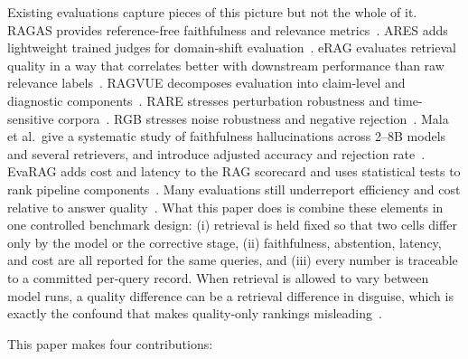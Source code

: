 Existing evaluations capture pieces of this picture but not the whole of
it. RAGAS provides reference-free faithfulness and relevance metrics~\cite{es2023ragas}.
ARES adds lightweight trained judges for domain-shift evaluation~\cite{saadfalcon2023ares}.
eRAG evaluates retrieval quality in a way that correlates better with
downstream performance than raw relevance labels~\cite{salemi2024erag}.
RAGVUE decomposes evaluation into claim-level and diagnostic
components~\cite{murugaraj2025ragvue}. RARE stresses perturbation
robustness and time-sensitive corpora~\cite{zeng2025rare}. RGB stresses
noise robustness and negative rejection~\cite{chen2023rgb}. Mala et al.\
give a systematic study of faithfulness hallucinations across 2--8B
models and several retrievers, and introduce adjusted accuracy and
rejection rate~\cite{mala2026faithfulness}. EvaRAG
adds cost and latency to the RAG scorecard and uses statistical tests to
rank pipeline components~\cite{elkiran2026empirical}.
Many evaluations still underreport efficiency and cost relative to answer
quality~\cite{wu2024survey,saadfalcon2023ares}. What this paper does is
combine these elements in one controlled benchmark design: (i) retrieval
is held fixed so that two cells differ only by the model or the corrective
stage, (ii) faithfulness, abstention, latency, and cost are all reported
for the same queries, and (iii) every number is traceable to a committed
per-query record. When retrieval is allowed to vary between model runs,
a quality difference can be a retrieval difference in disguise, which is
exactly the confound that makes quality-only rankings misleading~\cite{elkiran2026empirical}.

This paper makes four contributions:

